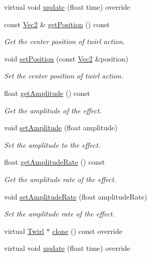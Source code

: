 \begin{DoxyCompactItemize}
\item 
virtual void \hyperlink{classTwirl_a5f8f817299b42802d69bf94be42bc858}{update} (float time) override
\item 
const \hyperlink{classVec2}{Vec2} \& \hyperlink{classTwirl_aad84af7fd087bb5d5442b13737e1004d}{get\+Position} () const
\begin{DoxyCompactList}\small\item\em Get the center position of twirl action. \end{DoxyCompactList}\item 
void \hyperlink{classTwirl_a246973ddc49ac4e1a852e73c879c9bcf}{set\+Position} (const \hyperlink{classVec2}{Vec2} \&position)
\begin{DoxyCompactList}\small\item\em Set the center position of twirl action. \end{DoxyCompactList}\item 
float \hyperlink{classTwirl_adfde81b4bf0f6401c195ab191367c48b}{get\+Amplitude} () const
\begin{DoxyCompactList}\small\item\em Get the amplitude of the effect. \end{DoxyCompactList}\item 
void \hyperlink{classTwirl_abfc08e832e96fcddce09d0e26c84cf91}{set\+Amplitude} (float amplitude)
\begin{DoxyCompactList}\small\item\em Set the amplitude to the effect. \end{DoxyCompactList}\item 
float \hyperlink{classTwirl_afa43bbaf322404dfc8b09707639f5d04}{get\+Amplitude\+Rate} () const
\begin{DoxyCompactList}\small\item\em Get the amplitude rate of the effect. \end{DoxyCompactList}\item 
void \hyperlink{classTwirl_a498a1b1fee7b27570130b6c19ca67b38}{set\+Amplitude\+Rate} (float amplitude\+Rate)
\begin{DoxyCompactList}\small\item\em Set the amplitude rate of the effect. \end{DoxyCompactList}\item 
virtual \hyperlink{classTwirl}{Twirl} $\ast$ \hyperlink{classTwirl_a9121ce0fe151b7f7224caab88f688aab}{clone} () const override
\item 
virtual void \hyperlink{classTwirl_acd70f7860c9a7c7aadf3b75051aa0857}{update} (float time) override
\end{DoxyCompactItemize}

